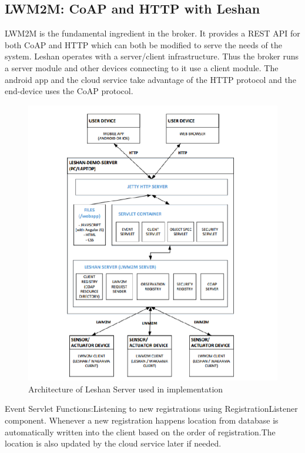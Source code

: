 \subsection{LWM2M: CoAP and HTTP with Leshan}


LWM2M is the fundamental ingredient in the broker. It provides a REST API for both CoAP and HTTP which can both be modified to serve the needs of the system. Leshan operates with a server/client infrastructure. Thus the broker runs a server module and other devices connecting to it use a client module. The android app and the cloud service take advantage of the HTTP protocol and the end-device uses the CoAP protocol.

\begin{figure}[h!]
	\centering
	\begin{center}
		\includegraphics[width=1\linewidth]{img/LeshanArc}
		\caption{Architecture of Leshan Server used in implementation} 
		\label{fig:fig3}
	\end{center}
\end{figure}

Event Servlet Functions:Listening to new registrations using RegistrationListener component. Whenever a new registration happens location from database is automatically written into the client based on the order of registration.The location is also updated by the cloud service later if needed. 

